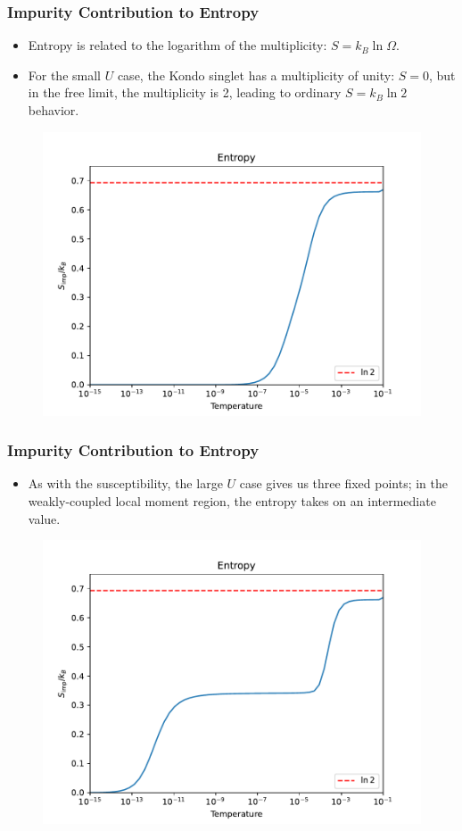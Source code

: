 \documentclass{beamer}
\begin{document}
\begin{frame}
  \frametitle{Impurity Contribution to Entropy}

  \begin{itemize}
  \item Entropy is related to the logarithm of the multiplicity: $S = k_B \ln\Omega$.
  \item For the small $U$ case, the Kondo singlet has a multiplicity of unity: $S = 0$, but in the free limit, the multiplicity is 2, leading to ordinary $S = k_B\ln2$ behavior.
  \end{itemize}

  \begin{figure}
    \centering
    \includegraphics[width=0.65\linewidth]{./gfx/s_lowU.pdf}
  \end{figure}
\end{frame}

\begin{frame}
  \frametitle{Impurity Contribution to Entropy}

  \begin{itemize}
  \item As with the susceptibility, the large $U$ case gives us three fixed points; in the weakly-coupled local moment region, the entropy takes on an intermediate value.
  \end{itemize}

  \begin{figure}
    \centering
    \includegraphics[width=0.65\linewidth]{./gfx/s.pdf}
  \end{figure}
\end{frame}
\end{document}
